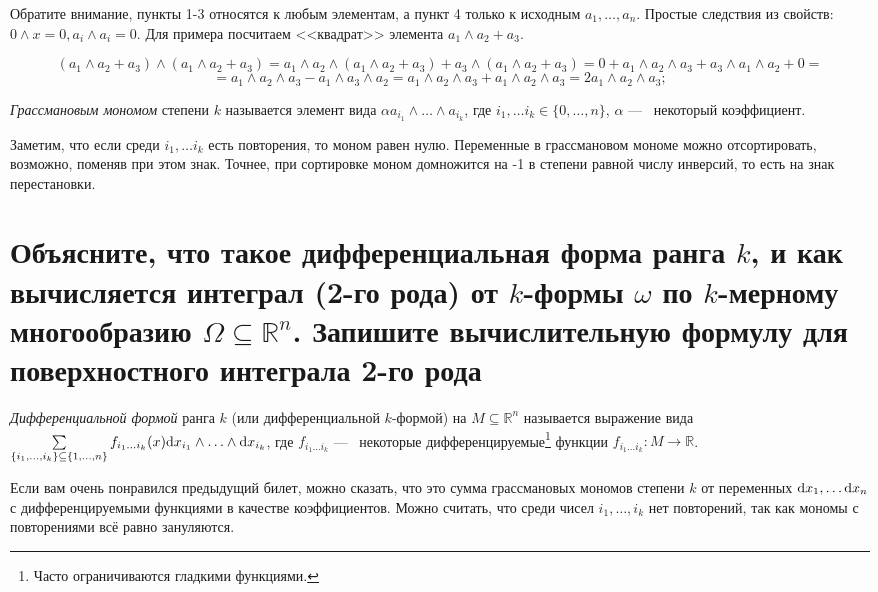 \documentclass{article}
\begin{document}
	Обратите внимание, пункты 1-3 относятся к любым элементам, а пункт 4 только к исходным $a_1, \ldots, a_n$. Простые следствия из свойств: $0 \land x = 0, a_i \land a_i = 0$. Для примера посчитаем <<квадрат>> элемента $a_1 \land a_2 + a_3$.
	
	\[ (a_1 \land a_2 + a_3) \land (a_1 \land a_2 + a_3) = a_1 \land a_2 \land (a_1 \land a_2 + a_3) + a_3 \land (a_1 \land a_2 + a_3) = 0 + a_1 \land a_2 \land a_3 + a_3 \land a_1 \land a_2 + 0 = \] \[ = a_1 \land a_2 \land a_3  - a_1 \land a_3 \land a_2 = a_1 \land a_2 \land a_3 + a_1 \land a_2 \land a_3 = 2a_1 \land a_2 \land a_3;\]

	\begin{definition}
		\textit{Грассмановым мономом} степени $k$ называется элемент вида $\alpha a_{i_1} \land \ldots \land a_{i_k}$, где $ i_1, \ldots i_k \in \{0, \ldots, n \}$, $\alpha$ ---~ некоторый коэффициент.
	\end{definition}

	Заметим, что если среди $i_1, \ldots i_k$ есть повторения, то моном равен нулю. Переменные в грассмановом мономе можно отсортировать, возможно, поменяв при этом знак. Точнее, при сортировке моном домножится на -1 в степени равной числу инверсий, то есть на знак перестановки.

	\section{Объясните, что такое дифференциальная форма ранга $k$, и как вычисляется интеграл (2-го рода) от $k$-формы $\omega$ по $k$-мерному многообразию $\Omega \subseteq \mathbb{R}^n$. Запишите вычислительную формулу для поверхностного интеграла 2-го рода}

	\begin{definition}
		\textit{Дифференциальной формой} ранга $k$ (или дифференциальной $k$-формой) на $M \subseteq \mathbb{R}^n$ называется выражение вида $\sum\limits_{\{i_1, \ldots, i_k\} \subseteq \{1, \ldots, n\}} f_{i_1 \ldots i_k}(x)\mathrm{d} x_{i_1} \land \ldots \land \mathrm{d} x_{i_k}$, где $f_{i_1\ldots i_k}$ ---~ некоторые дифференцируемые\footnote{Часто ограничиваются гладкими функциями.} функции $f_{i_1\ldots i_k}:M \to \mathbb{R}$.
	\end{definition}

	Если вам очень понравился предыдущий билет, можно сказать, что это сумма грассмановых мономов степени $k$ от переменных $\mathrm{d} x_1, \ldots \mathrm{d} x_n$ с дифференцируемыми функциями в качестве коэффициентов. Можно считать, что среди чисел $i_1, \ldots, i_k$ нет повторений, так как мономы с повторениями всё равно зануляются.
\end{document}
